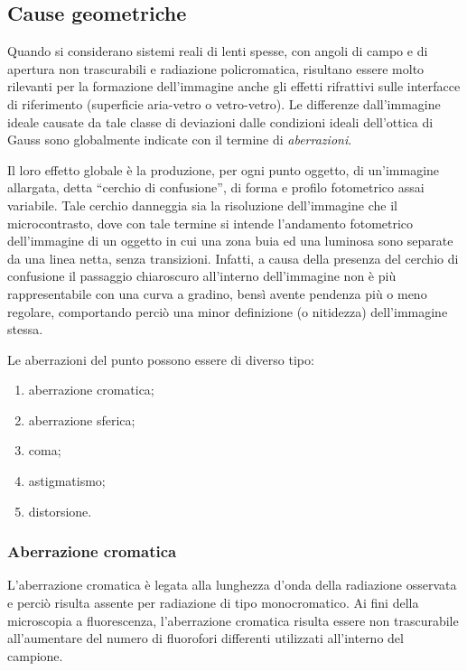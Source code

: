 \subsection{Cause geometriche}

Quando si considerano sistemi reali di lenti spesse, con angoli di campo e di apertura non trascurabili e radiazione policromatica, risultano essere molto rilevanti per la formazione dell'immagine anche gli effetti rifrattivi sulle interfacce di riferimento (superficie aria-vetro o vetro-vetro).
Le differenze dall'immagine ideale causate da tale classe di deviazioni dalle condizioni ideali dell'ottica di Gauss sono globalmente indicate con il termine di \textit{aberrazioni}.

Il loro effetto globale è la produzione, per ogni punto oggetto, di un'immagine allargata, detta ``cerchio di confusione'', di forma e profilo fotometrico assai variabile. 
Tale cerchio danneggia sia la risoluzione dell'immagine che il microcontrasto, dove con tale termine si intende l'andamento fotometrico dell'immagine di un oggetto in cui una zona buia ed una luminosa sono separate da una linea netta, senza transizioni. 
Infatti, a causa della presenza del cerchio di confusione il passaggio chiaroscuro all'interno dell'immagine non è più rappresentabile con una curva a gradino, bensì avente pendenza più o meno regolare, comportando perciò una minor definizione (o nitidezza) dell'immagine stessa.

Le aberrazioni del punto possono essere di diverso tipo:
\begin{enumerate}
 \item aberrazione cromatica;
 \item aberrazione sferica;
 \item coma;
 \item astigmatismo;
 \item distorsione.
\end{enumerate}


\subsubsection*{Aberrazione cromatica}
L'aberrazione cromatica è legata alla lunghezza d'onda della radiazione osservata e perciò risulta assente per radiazione di tipo monocromatico. 
Ai fini della microscopia a fluorescenza, l'aberrazione cromatica risulta essere non trascurabile all'aumentare del numero di fluorofori differenti utilizzati all'interno del campione.

